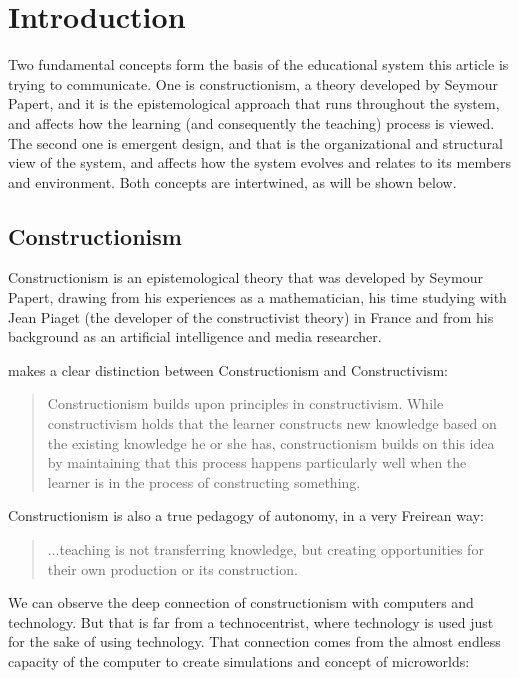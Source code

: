 \section{Introduction}


Two fundamental concepts form the basis of the educational system this article is trying to
communicate. One is constructionism, a theory developed by Seymour Papert, and
it is the epistemological approach that runs throughout the system, and affects
how the learning (and consequently the teaching) process is viewed. The second
one is emergent design, and that is the organizational and structural view of
the system, and affects how the system evolves and relates to its members and
environment. Both concepts are intertwined, as will be shown below. 

\subsection{Constructionism}
Constructionism is an epistemological theory that was developed by Seymour
Papert, drawing from his experiences as a mathematician, his time studying with
Jean Piaget (the developer of the constructivist theory) in France and from his
background as an artificial intelligence and media researcher.

\cite{education:cavallo_building_knowledge} makes a clear distinction between Constructionism and
Constructivism:

\begin{quote}
  Constructionism builds upon principles in constructivism. While constructivism
  holds that the learner constructs new knowledge based on the existing knowledge
  he or she has, constructionism builds on this idea by maintaining that this
  process happens particularly well when the learner is in the process of
  constructing something.                   
  
\end{quote}

Constructionism is also a true pedagogy of autonomy, in a very Freirean way:
\begin{quote}
...teaching is not transferring knowledge, but creating opportunities for their own
production or its construction.
\cite{education:paulo_freire__pedagogia_da_autonomia}
\end{quote}

We can observe the deep connection of constructionism with computers and
technology. But that is far from a technocentrist, where technology is used just
for the sake of using technology. That connection comes from the almost endless
capacity of the computer to create simulations and concept of microworlds:

